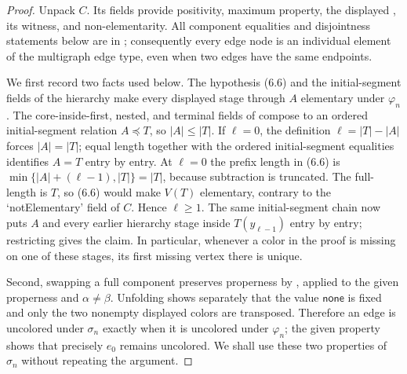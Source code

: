 \begin{proof}
Unpack $C$.  Its fields provide positivity, maximum property, the
displayed , its
 witness, and non-elementarity.  All component
equalities and disjointness statements below are in
; consequently every edge node is an
individual element of the multigraph edge type, even when two edges
have the same endpoints.

We first record two facts used below.  The hypothesis (6.6)
and the initial-segment fields of the hierarchy make every displayed
stage through $A$ elementary under $\varphi_n$.  The core-inside-first, nested, and
terminal fields of  compose to an ordered
initial-segment relation $A\preccurlyeq T$, so $|A|\leq|T|$.  If
$\ell=0$, the definition $\ell=|T|-|A|$ forces $|A|=|T|$; equal length
together with the ordered initial-segment
equalities identifies $A=T$ entry by entry.  At $\ell=0$ the prefix length
in (6.6) is
$\min\{|A|+(\ell-1),|T|\}=|T|$, because subtraction is truncated.
The full-length  is $T$, so (6.6) would make
$V(T)$ elementary, contrary to the `notElementary' field of $C$.
Hence $\ell\geq1$.  The same initial-segment chain now puts $A$ and every
earlier hierarchy stage inside $T(y_{\ell-1})$ entry by entry; restricting
 gives the claim.  In particular,
whenever a color in the proof is missing on one of these stages, its
first missing vertex there is unique.

Second, swapping a full component preserves properness by
, applied to the given properness
and $\alpha\ne\beta$.  Unfolding
 shows separately that the value
$\mathsf{none}$ is fixed and only the two nonempty displayed colors are
transposed.  Therefore an edge is uncolored under $\sigma_n$ exactly
when it is uncolored under $\varphi_n$; the given
 property shows that precisely $e_0$
remains uncolored.  We shall use these two properties of $\sigma_n$
without repeating the argument.


\end{proof}
